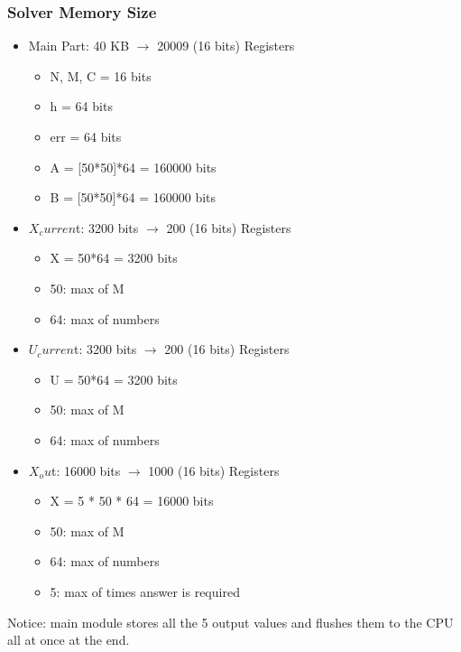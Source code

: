 \documentclass[12pt]{report}
\begin{document}
\subsubsection{Solver Memory Size}
\begin{itemize}
    \item Main Part: 40 KB $\rightarrow$ 20009 (16 bits) Registers
    \begin{itemize}
        \item N, M, C = 16 bits
        \item h = 64 bits
        \item err = 64 bits
        \item A = [50*50]*64 = 160000 bits
        \item B = [50*50]*64 = 160000 bits
    \end{itemize}
    \item $X_curren$t: 3200 bits $\rightarrow$ 200 (16 bits) Registers
    \begin{itemize}
        \item X = 50*64 = 3200 bits
        \item 50: max of M
        \item 64: max of numbers
    \end{itemize}
    \item $U_curren$t: 3200 bits $\rightarrow$ 200 (16 bits) Registers
    \begin{itemize}
        \item U = 50*64 = 3200 bits
        \item 50: max of M
        \item 64: max of numbers
    \end{itemize}
    \item $X_ou$t: 16000 bits $\rightarrow$ 1000 (16 bits) Registers
    \begin{itemize}
        \item X = 5 * 50 * 64 = 16000 bits
        \item 50: max of M
        \item 64: max of numbers
        \item 5: max of times answer is required
    \end{itemize}
\end{itemize}

Notice: main module stores all the 5 output values and flushes them to the CPU all at once at the end.
\end{document}
